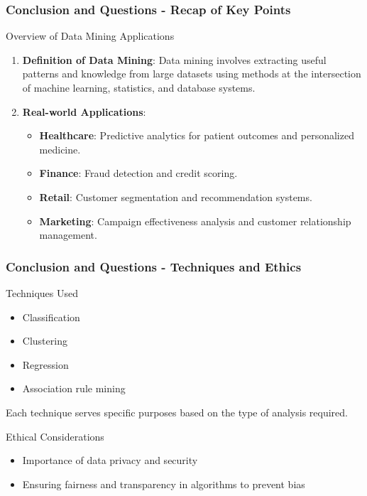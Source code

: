 \documentclass{beamer}
\begin{document}
\begin{frame}[fragile]
    \frametitle{Conclusion and Questions - Recap of Key Points}

    \begin{block}{Overview of Data Mining Applications}
        \begin{enumerate}
            \item \textbf{Definition of Data Mining}:
            Data mining involves extracting useful patterns and knowledge from large datasets using methods at the intersection of machine learning, statistics, and database systems.
        
            \item \textbf{Real-world Applications}:
            \begin{itemize}
                \item \textbf{Healthcare}: Predictive analytics for patient outcomes and personalized medicine.
                \item \textbf{Finance}: Fraud detection and credit scoring.
                \item \textbf{Retail}: Customer segmentation and recommendation systems.
                \item \textbf{Marketing}: Campaign effectiveness analysis and customer relationship management.
            \end{itemize}
        \end{enumerate}
    \end{block}
\end{frame}

\begin{frame}[fragile]
    \frametitle{Conclusion and Questions - Techniques and Ethics}

    \begin{block}{Techniques Used}
        \begin{itemize}
            \item Classification
            \item Clustering
            \item Regression
            \item Association rule mining
        \end{itemize}
        Each technique serves specific purposes based on the type of analysis required.
    \end{block}

    \begin{block}{Ethical Considerations}
        \begin{itemize}
            \item Importance of data privacy and security
            \item Ensuring fairness and transparency in algorithms to prevent bias
        \end{itemize}
    \end{block}
\end{frame}
\end{document}
